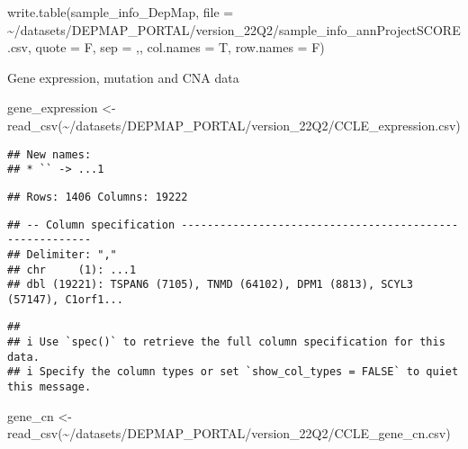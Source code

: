 \documentclass[
]{article}
\newenvironment{Shaded}{\begin{snugshade}}{\end{snugshade}}
\newcommand{\AttributeTok}[1]{\textcolor[rgb]{0.77,0.63,0.00}{#1}}
\newcommand{\FunctionTok}[1]{\textcolor[rgb]{0.00,0.00,0.00}{#1}}
\newcommand{\NormalTok}[1]{#1}
\newcommand{\OtherTok}[1]{\textcolor[rgb]{0.56,0.35,0.01}{#1}}
\newcommand{\StringTok}[1]{\textcolor[rgb]{0.31,0.60,0.02}{#1}}
\begin{document}
\begin{Shaded}
\begin{Highlighting}[]
\FunctionTok{write.table}\NormalTok{(sample\_info\_DepMap, }
            \AttributeTok{file =} \StringTok{\textquotesingle{}\textasciitilde{}/datasets/DEPMAP\_PORTAL/version\_22Q2/sample\_info\_annProjectSCORE.csv\textquotesingle{}}\NormalTok{, }
            \AttributeTok{quote =}\NormalTok{ F, }\AttributeTok{sep =} \StringTok{\textquotesingle{},\textquotesingle{}}\NormalTok{, }\AttributeTok{col.names =}\NormalTok{ T, }\AttributeTok{row.names =}\NormalTok{ F)}
\end{Highlighting}
\end{Shaded}

Gene expression, mutation and CNA data

\begin{Shaded}
\begin{Highlighting}[]
\NormalTok{gene\_expression }\OtherTok{\textless{}{-}} \FunctionTok{read\_csv}\NormalTok{(}\StringTok{\textquotesingle{}\textasciitilde{}/datasets/DEPMAP\_PORTAL/version\_22Q2/CCLE\_expression.csv\textquotesingle{}}\NormalTok{)}
\end{Highlighting}
\end{Shaded}

\begin{verbatim}
## New names:
## * `` -> ...1
\end{verbatim}

\begin{verbatim}
## Rows: 1406 Columns: 19222
\end{verbatim}

\begin{verbatim}
## -- Column specification --------------------------------------------------------
## Delimiter: ","
## chr     (1): ...1
## dbl (19221): TSPAN6 (7105), TNMD (64102), DPM1 (8813), SCYL3 (57147), C1orf1...
\end{verbatim}

\begin{verbatim}
## 
## i Use `spec()` to retrieve the full column specification for this data.
## i Specify the column types or set `show_col_types = FALSE` to quiet this message.
\end{verbatim}

\begin{Shaded}
\begin{Highlighting}[]
\NormalTok{gene\_cn }\OtherTok{\textless{}{-}} \FunctionTok{read\_csv}\NormalTok{(}\StringTok{\textquotesingle{}\textasciitilde{}/datasets/DEPMAP\_PORTAL/version\_22Q2/CCLE\_gene\_cn.csv\textquotesingle{}}\NormalTok{)}
\end{Highlighting}
\end{Shaded}
\end{document}
